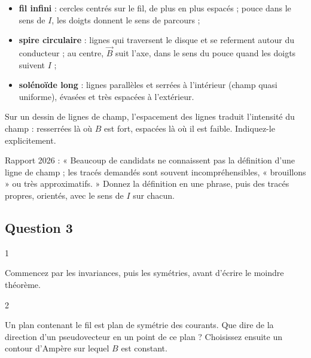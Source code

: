 \documentclass[11pt,a4paper]{article}
\providecommand{\tightlist}{\setlength{\itemsep}{0pt}\setlength{\parskip}{0pt}}
\begin{document}
\begin{itemize}
\tightlist
\item
  \textbf{fil infini} : cercles centrés sur le fil, de plus en plus espacés ; pouce dans le sens de \(I\), les doigts donnent le sens de parcours ;
\item
  \textbf{spire circulaire} : lignes qui traversent le disque et se referment autour du conducteur ; au centre, \(\vec B\) suit l'axe, dans le sens du pouce quand les doigts suivent \(I\) ;
\item
  \textbf{solénoïde long} : lignes parallèles et serrées à l'intérieur (champ quasi uniforme), évasées et très espacées à l'extérieur.
\end{itemize}

\begin{methode}

Sur un dessin de lignes de champ, l'espacement des lignes traduit l'intensité du champ : resserrées là où \(B\) est fort, espacées là où il est faible. Indiquez-le explicitement.

\end{methode}

\begin{jury}

Rapport 2026 : « Beaucoup de candidats ne connaissent pas la définition d'une ligne de champ ; les tracés demandés sont souvent incompréhensibles, « brouillons » ou très approximatifs. » Donnez la définition en une phrase, puis des tracés propres, orientés, avec le sens de \(I\) sur chacun.

\end{jury}

\hypertarget{question-3}{%
\subsection{Question 3}\label{question-3}}

\begin{indication}{1}

Commencez par les invariances, puis les symétries, avant d'écrire le moindre théorème.

\end{indication}

\begin{indication}{2}

Un plan contenant le fil est plan de symétrie des courants. Que dire de la direction d'un pseudovecteur en un point de ce plan ? Choisissez ensuite un contour d'Ampère sur lequel \(B\) est constant.

\end{indication}
\end{document}
